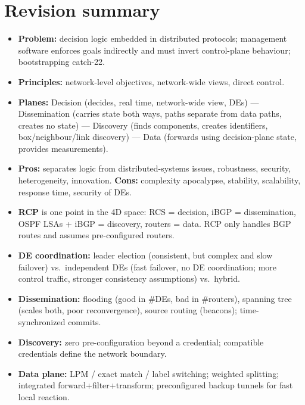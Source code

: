 \section{Revision summary}
\begin{itemize}
\item \textbf{Problem:} decision logic embedded in distributed protocols; management software enforces goals indirectly and must invert control-plane behaviour; bootstrapping catch-22.
\item \textbf{Principles:} network-level objectives, network-wide views, direct control.
\item \textbf{Planes:} Decision (decides, real time, network-wide view, DEs) --- Dissemination (carries state both ways, paths separate from data paths, creates no state) --- Discovery (finds components, creates identifiers, box/neighbour/link discovery) --- Data (forwards using decision-plane state, provides measurements).
\item \textbf{Pros:} separates logic from distributed-systems issues, robustness, security, heterogeneity, innovation. \textbf{Cons:} complexity apocalypse, stability, scalability, response time, security of DEs.
\item \textbf{RCP} is one point in the 4D space: RCS = decision, iBGP = dissemination, OSPF LSAs + iBGP = discovery, routers = data. RCP only handles BGP routes and assumes pre-configured routers.
\item \textbf{DE coordination:} leader election (consistent, but complex and slow failover) vs.\ independent DEs (fast failover, no DE coordination; more control traffic, stronger consistency assumptions) vs.\ hybrid.
\item \textbf{Dissemination:} flooding (good in \#DEs, bad in \#routers), spanning tree (scales both, poor reconvergence), source routing (beacons); time-synchronized commits.
\item \textbf{Discovery:} zero pre-configuration beyond a credential; compatible credentials define the network boundary.
\item \textbf{Data plane:} LPM / exact match / label switching; weighted splitting; integrated forward+filter+transform; preconfigured backup tunnels for fast local reaction.
\end{itemize}
